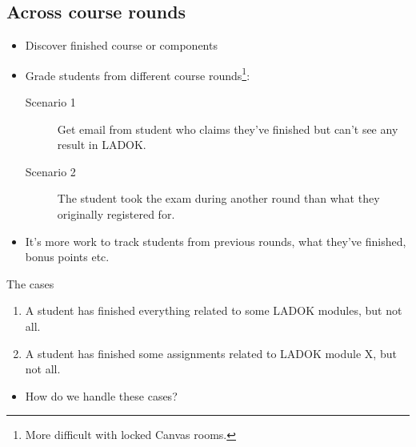 \subsection{Across course rounds}

\begin{frame}
  \begin{example}
    \begin{itemize}
      \item \alert<1>{Discover finished course or components}
      \item \alert<1>{Grade students from different course rounds}\footnote{%
          More difficult with locked Canvas rooms.
        }:
        \begin{description}
          \item[Scenario 1] \alert<1>{Get email from student who claims they've 
            finished but can't see any result in LADOK.}

          \item[Scenario 2] The student took the exam during another round than 
            what they originally registered for.
        \end{description}

      \item \alert<1>{It's more work to track students from previous rounds, 
        what they've finished, bonus points etc.}
    \end{itemize}
  \end{example}
\end{frame}

\begin{frame}[fragile]
  \begin{block}{The cases}
    \begin{enumerate}
      \item A student has finished everything related to some LADOK modules, 
        but not all.
      \item A student has finished some assignments related to LADOK module X, 
        but not all.
    \end{enumerate}
  \end{block}

  \begin{question}
    \begin{itemize}
      \item How do we handle these cases?
    \end{itemize}
  \end{question}
\end{frame}

